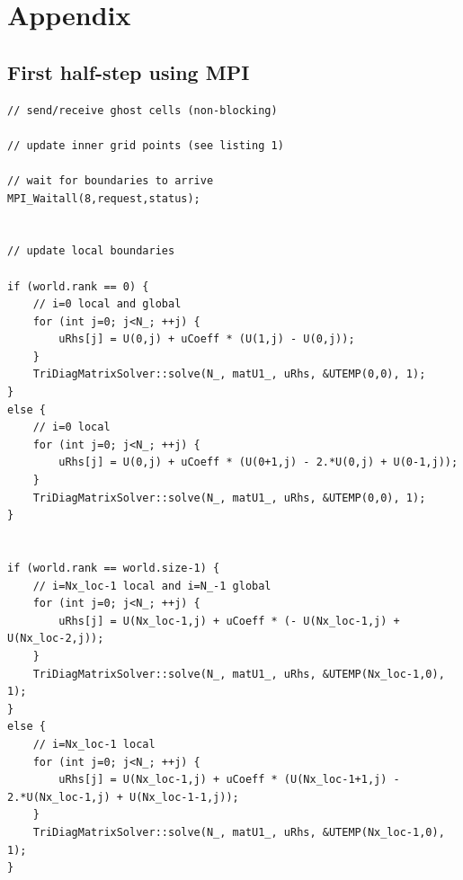 \documentclass[a4paper]{article}
\begin{document}
\clearpage

\section{Appendix}

\subsection{First half-step using MPI}\label{sec:lst-adi-mpi}
\begin{lstlisting}[label={lst:adi-mpi}, caption={First half-step parallelized with MPI}]
// send/receive ghost cells (non-blocking)

// update inner grid points (see listing 1)

// wait for boundaries to arrive
MPI_Waitall(8,request,status);


// update local boundaries

if (world.rank == 0) {
    // i=0 local and global
    for (int j=0; j<N_; ++j) {
        uRhs[j] = U(0,j) + uCoeff * (U(1,j) - U(0,j));
    }
    TriDiagMatrixSolver::solve(N_, matU1_, uRhs, &UTEMP(0,0), 1);
}
else {
    // i=0 local
    for (int j=0; j<N_; ++j) {
        uRhs[j] = U(0,j) + uCoeff * (U(0+1,j) - 2.*U(0,j) + U(0-1,j));
    }
    TriDiagMatrixSolver::solve(N_, matU1_, uRhs, &UTEMP(0,0), 1);
}


if (world.rank == world.size-1) {
    // i=Nx_loc-1 local and i=N_-1 global
    for (int j=0; j<N_; ++j) {
        uRhs[j] = U(Nx_loc-1,j) + uCoeff * (- U(Nx_loc-1,j) + U(Nx_loc-2,j));
    }
    TriDiagMatrixSolver::solve(N_, matU1_, uRhs, &UTEMP(Nx_loc-1,0), 1);
}
else {
    // i=Nx_loc-1 local
    for (int j=0; j<N_; ++j) {
        uRhs[j] = U(Nx_loc-1,j) + uCoeff * (U(Nx_loc-1+1,j) - 2.*U(Nx_loc-1,j) + U(Nx_loc-1-1,j));
    }
    TriDiagMatrixSolver::solve(N_, matU1_, uRhs, &UTEMP(Nx_loc-1,0), 1);
}
\end{lstlisting}
\end{document}
